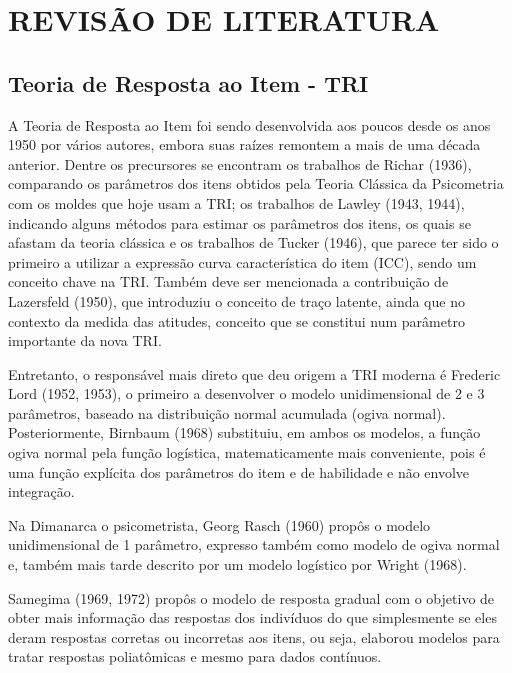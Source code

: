 \documentclass[12pt]{article}
\begin{document}
\section{REVISÃO DE LITERATURA} \label{sec:firstpage}
\subsection{Teoria de Resposta ao Item - TRI}

A Teoria de Resposta ao Item foi sendo desenvolvida aos poucos desde os anos 1950 por vários autores, embora suas raízes remontem a mais de uma década anterior. Dentre os precursores se encontram os trabalhos de Richar (1936), comparando os parâmetros dos itens obtidos pela Teoria Clássica da Psicometria com os moldes que hoje usam a TRI; os trabalhos de Lawley (1943, 1944), indicando alguns métodos para estimar os parâmetros dos itens, os quais se afastam da teoria clássica e os trabalhos de Tucker (1946), que parece ter sido o primeiro a utilizar a expressão curva característica do item (ICC), sendo um conceito chave na TRI. Também deve ser mencionada a contribuição de Lazersfeld (1950), que introduziu o conceito de traço latente, ainda que no contexto da medida das atitudes, conceito que se constitui num parâmetro importante da nova TRI.

Entretanto, o responsável mais direto que deu origem a TRI moderna é Frederic Lord (1952, 1953), o primeiro a desenvolver o modelo unidimensional de 2 e 3 parâmetros, baseado na distribuição normal acumulada (ogiva normal). Posteriormente, Birnbaum (1968) substituiu, em ambos os modelos, a função ogiva normal pela função logística, matematicamente mais conveniente, pois é uma função explícita dos parâmetros do item e de habilidade e não envolve integração.

\newpage








Na Dimanarca o psicometrista, Georg Rasch (1960) propôs o modelo unidimensional de 1 parâmetro, expresso também como modelo de ogiva normal e, também mais tarde descrito por um modelo logístico por Wright (1968). 

Samegima (1969, 1972) propôs o modelo de resposta gradual com o objetivo de obter mais informação das respostas dos indivíduos do que simplesmente se eles deram respostas corretas ou incorretas aos itens, ou seja, elaborou modelos para tratar respostas poliatômicas e mesmo para dados contínuos.
\end{document}
